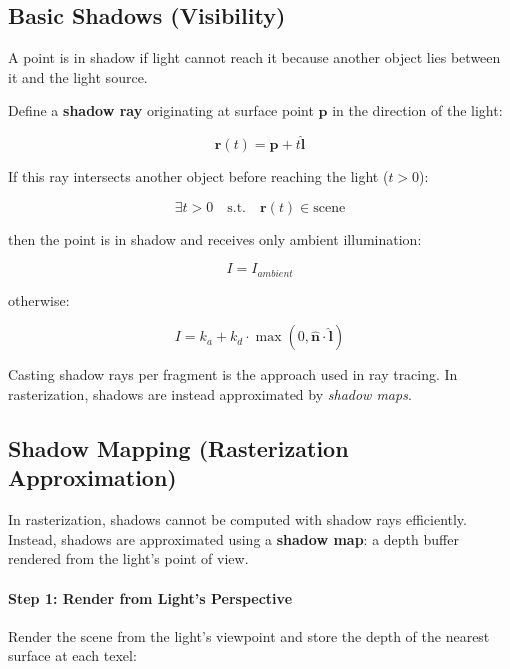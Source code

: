 \documentclass[11pt]{article}
\begin{document}
\subsection{Basic Shadows (Visibility)}

A point is in shadow if light cannot reach it because another object lies between it and the light source.

Define a \textbf{shadow ray} originating at surface point $\mathbf{p}$ in the direction of the light:

\begin{equation}
    \mathbf{r}(t) = \mathbf{p} + t \hat{\mathbf{l}}
\end{equation}

If this ray intersects another object before reaching the light ($t > 0$):

\begin{equation}
    \exists t > 0 \quad \text{s.t.} \quad \mathbf{r}(t) \in \text{scene}
\end{equation}

then the point is in shadow and receives only ambient illumination:

\begin{equation}
    I = I_{ambient}
\end{equation}

otherwise:

\begin{equation}
    I = k_a + k_d \cdot \max(0, \hat{\mathbf{n}} \cdot \hat{\mathbf{l}})
\end{equation}

Casting shadow rays per fragment is the approach used in ray tracing. In rasterization, shadows are instead approximated by \emph{shadow maps}.


\subsection{Shadow Mapping (Rasterization Approximation)}

In rasterization, shadows cannot be computed with shadow rays efficiently. Instead, shadows are approximated using a \textbf{shadow map}: a depth buffer rendered from the light's point of view.

\paragraph{Step 1: Render from Light's Perspective}

Render the scene from the light's viewpoint and store the depth of the nearest surface at each texel:
\end{document}
